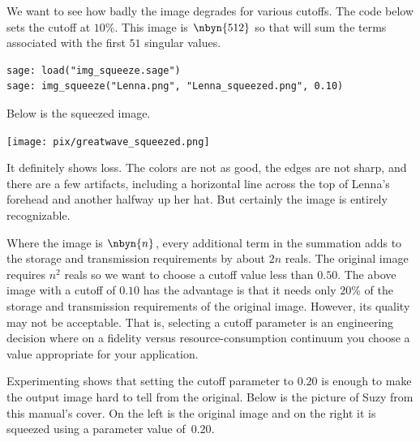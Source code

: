 We want to see how badly the image degrades for various cutoffs.
The code below sets the cutoff at $10$\%.
This image is $\nbyn{512}$ so that will sum the terms associated
with the first $51$ singular 
values.
\begin{lstlisting}
sage: load("img_squeeze.sage")                                 
sage: img_squeeze("Lenna.png", "Lenna_squeezed.png", 0.10)
\end{lstlisting}
Below is the squeezed image.
\begin{center}
  \texttt{[image: pix/greatwave\_squeezed.png]}
\end{center}
It definitely shows loss.
The colors are not as good, the edges are not sharp, and there are 
a few artifacts, including a horizontal line across the top of 
Lenna's forehead and another halfway up her hat.
But certainly the image is entirely recognizable.

Where the image is $\nbyn{n}$, every additional term in the summation
adds to the storage and transmission requirements by about $2n$ reals.
The original image requires $n^2$ reals so we want to choose a cutoff value 
less than $0.50$.
The above image with a cutoff of $0.10$ has the advantage is that it needs 
only $20\%$ of the storage
and transmission requirements of the original image.
However, its quality may not be acceptable.
That is, selecting a cutoff parameter is an engineering decision where
on a fidelity versus resource-consumption continuum 
you choose a value appropriate for your application.
 
Experimenting shows that setting
the cutoff parameter to $0.20$ is enough to make the output image hard to tell
from the original.
Below is the picture of Suzy 
from this manual's cover.
On the left is the original image
and on the right it is squeezed using a parameter value of~$0.20$.
\begin{center}
  \quad
\end{center}



